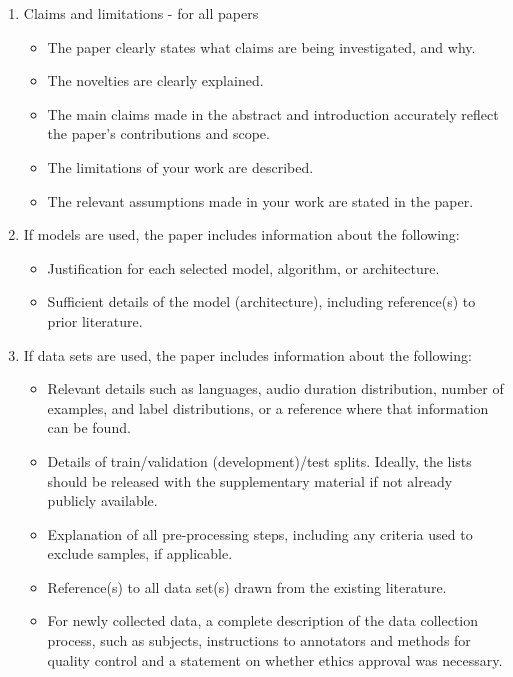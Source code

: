 \documentclass[cameraready]{Interspeech}
\begin{document}
\begin{enumerate}

\item Claims and limitations - for all papers
\begin{itemize}

\item The paper clearly states what claims are being investigated, and why.
\item The novelties are clearly explained.
\item The main claims made in the abstract and introduction accurately reflect the paper’s contributions and scope.
\item The limitations of your work are described.
\item The relevant assumptions made in your work are stated in the paper.
\end{itemize}

\item If models are used, the paper includes information about the following:
\begin{itemize}
    \item Justification for each selected model, algorithm, or architecture.
    \item Sufficient details of the model (architecture), including reference(s) to prior literature.
\end{itemize}

\item If data sets are used, the paper includes information about the following:
\begin{itemize}
\item Relevant details such as languages, audio duration distribution, number of examples, and label distributions, or a reference where that information can be found.
\item Details of train/validation (development)/test splits. Ideally, the lists should be released with the supplementary material if not already publicly available.
\item Explanation of all pre-processing steps, including any criteria used to exclude samples, if applicable.
\item Reference(s) to all data set(s) drawn from the existing literature.
\item For newly collected data, a complete description of the data collection process, such as subjects, instructions to annotators and methods for quality control and a statement on whether ethics approval was necessary.
\end{itemize}


\end{enumerate}
\end{document}
